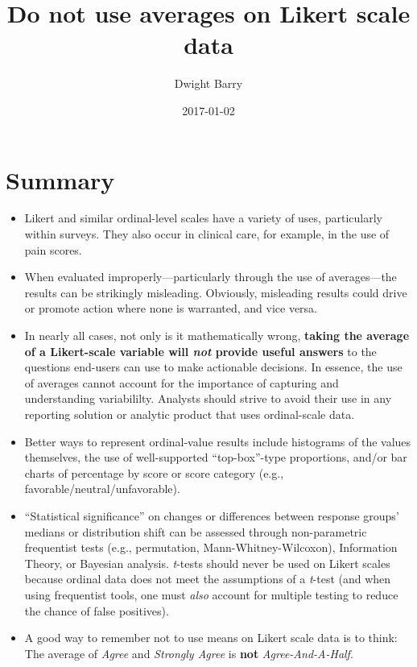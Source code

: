 \documentclass[]{book}
\title{Do not use averages on Likert scale data}
\author{Dwight Barry}
\date{2017-01-02}
\begin{document}
\maketitle

{
\setcounter{tocdepth}{1}
\tableofcontents
}
\chapter{Summary}\label{summary}

\begin{itemize}
\item
  Likert and similar ordinal-level scales have a variety of uses,
  particularly within surveys. They also occur in clinical care, for
  example, in the use of pain scores.
\item
  When evaluated improperly---particularly through the use of
  averages---the results can be strikingly misleading. Obviously,
  misleading results could drive or promote action where none is
  warranted, and vice versa.
\item
  In nearly all cases, not only is it mathematically wrong,
  \textbf{taking the average of a Likert-scale variable will \emph{not}
  provide useful answers} to the questions end-users can use to make
  actionable decisions. In essence, the use of averages cannot account
  for the importance of capturing and understanding variabililty.
  Analysts should strive to avoid their use in any reporting solution or
  analytic product that uses ordinal-scale data.
\item
  Better ways to represent ordinal-value results include histograms of
  the values themselves, the use of well-supported ``top-box''-type
  proportions, and/or bar charts of percentage by score or score
  category (e.g., favorable/neutral/unfavorable).
\item
  ``Statistical significance'' on changes or differences between
  response groups' medians or distribution shift can be assessed through
  non-parametric frequentist tests (e.g., permutation,
  Mann-Whitney-Wilcoxon), Information Theory, or Bayesian analysis.
  \emph{t}-tests should never be used on Likert scales because ordinal
  data does not meet the assumptions of a \emph{t}-test (and when using
  frequentist tools, one must \emph{also} account for multiple testing
  to reduce the chance of false positives).
\item
  A good way to remember not to use means on Likert scale data is to
  think: The average of \emph{Agree} and \emph{Strongly Agree} is
  \textbf{not} \emph{Agree-And-A-Half}.
\end{itemize}
\end{document}
